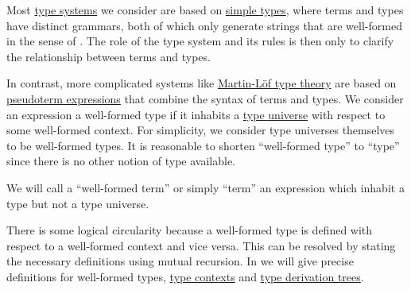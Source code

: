 \begin{remark}\label{rem:well_formed_context}
  Most \hyperref[def:abstract_type_system]{type systems} we consider are based on \hyperref[def:simple_type]{simple types}, where terms and types have distinct grammars, both of which only generate strings that are well-formed in the sense of . The role of the type system and its rules is then only to clarify the relationship between terms and types.

  In contrast, more complicated systems like \hyperref[def:mltt]{Martin-L\"of type theory} are based on \hyperref[con:pseudoterm_expression]{pseudoterm expressions} that combine the syntax of terms and types. We consider an expression a well-formed type if it inhabits a \hyperref[con:type_universe]{type universe} with respect to some well-formed context. For simplicity, we consider type universes themselves to be well-formed types. It is reasonable to shorten \enquote{well-formed type} to \enquote{type} since there is no other notion of type available.

  We will call a \enquote{well-formed term} or simply \enquote{term} an expression which inhabit a type but not a type universe.

  There is some logical circularity because a well-formed type is defined with respect to a well-formed context and vice versa. This can be resolved by stating the necessary definitions using mutual recursion. In  we will give precise definitions for well-formed types, \hyperref[def:type_context]{type contexts} and \hyperref[def:type_derivation_tree]{type derivation trees}.
\end{remark}

